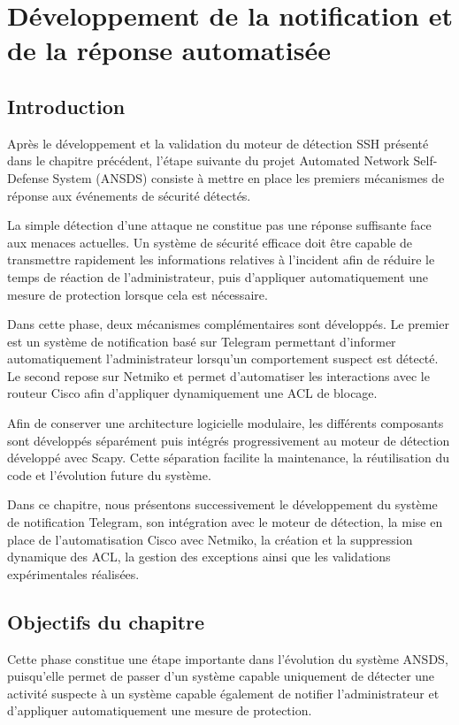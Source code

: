 \chapter{Développement de la notification et de la réponse automatisée}

\section{Introduction}

Après le développement et la validation du moteur de détection SSH présenté dans le chapitre précédent, l'étape suivante du projet Automated Network Self-Defense System (ANSDS) consiste à mettre en place les premiers mécanismes de réponse aux événements de sécurité détectés.

La simple détection d'une attaque ne constitue pas une réponse suffisante face aux menaces actuelles. Un système de sécurité efficace doit être capable de transmettre rapidement les informations relatives à l'incident afin de réduire le temps de réaction de l'administrateur, puis d'appliquer automatiquement une mesure de protection lorsque cela est nécessaire.

Dans cette phase, deux mécanismes complémentaires sont développés. Le premier est un système de notification basé sur Telegram permettant d'informer automatiquement l'administrateur lorsqu'un comportement suspect est détecté. Le second repose sur Netmiko et permet d'automatiser les interactions avec le routeur Cisco afin d'appliquer dynamiquement une ACL de blocage.

Afin de conserver une architecture logicielle modulaire, les différents composants sont développés séparément puis intégrés progressivement au moteur de détection développé avec Scapy. Cette séparation facilite la maintenance, la réutilisation du code et l'évolution future du système.

Dans ce chapitre, nous présentons successivement le développement du système de notification Telegram, son intégration avec le moteur de détection, la mise en place de l'automatisation Cisco avec Netmiko, la création et la suppression dynamique des ACL, la gestion des exceptions ainsi que les validations expérimentales réalisées.

\section{Objectifs du chapitre}

Cette phase constitue une étape importante dans l'évolution du système ANSDS, puisqu'elle permet de passer d'un système capable uniquement de détecter une activité suspecte à un système capable également de notifier l'administrateur et d'appliquer automatiquement une mesure de protection.

